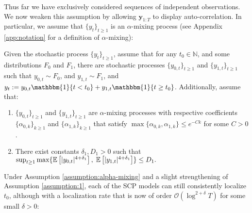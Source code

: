 Thus far we have exclusively considered sequences of independent observations. We now weaken this assumption by allowing $\mathbf{y}_{1:T}$ to display auto-correlation. In particular, we assume that $\{y_t\}_{t \geq 1}$ is an $\alpha$-mixing process (see Appendix \ref{app:notation} for a definition of $\alpha$-mixing): 

\begin{assumption}\label{assumption:alpha-mixing}
    Given the stochastic process $\{y_t\}_{t\geq 1}$, assume that for any $t_0 \in \mathbb{N}$, and some distributions $F_0$ and $F_1$, there are stochastic processes $\{y_{0,t}\}_{t \geq 1}$ and $\{y_{1,t}\}_{t \geq 1}$ such that $y_{0,t} \sim F_0$, and $y_{1,t} \sim F_1$, and $y_t := y_{0,t} \mathbbm{1}\{t < t_0\}  + y_{1,t}\mathbbm{1}\{t \geq t_0\}$. Additionally, assume that:
    \vspace{-10pt}
    \begin{enumerate}[label=(\roman*)]
        \item $\{y_{0,t}\}_{t \geq 1}$ and $\{y_{1,t}\}_{t \geq 1}$ are $\alpha$-mixing processes with respective coefficients $\{\alpha_{0,k}\}_{k\geq 1}$ and $\{\alpha_{1,k}\}_{k\geq 1}$ that satisfy $\max\{\alpha_{0,k}, \alpha_{1,k}\} \leq e^{-C k}$ for some $C > 0$.
        \item There exist constants $\delta_1, D_1 > 0$ such that $\sup_{t \geq 1} \max\{\mathbb{E}\left[|y_{0,t}|^{4+\delta_1}\right],\;\mathbb{E}\left[|y_{1,t}|^{4+\delta_1}\right]\}\leq D_1.$  
    \end{enumerate}
\end{assumption}
Under Assumption \ref{assumption:alpha-mixing} and a slight strengthening of Assumption \ref{assumption:1}, each of the SCP models can still consistently localize $t_0$, although with a localization rate that is now of order $\mathcal{O}(\log^{2+\delta} T)$ for some small $\delta > 0$:
